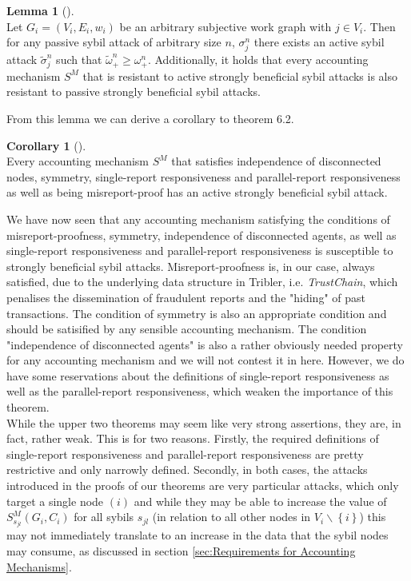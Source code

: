 \documentclass[11pt,a4paper]{report}
\theoremstyle{definition}
\theoremstyle{theorem}
\theoremstyle{proposition}
\theoremstyle{corollary}
\newtheorem{corollary}{Corollary}[section]
\theoremstyle{lemma}
\newtheorem{lemma}{Lemma}[section]
\theoremstyle{example}
\theoremstyle{remark}
\begin{document}
\begin{lemma}[]\ \\
Let $G_i=(V_i,E_i,w_i)$ be an arbitrary subjective work graph with $j\in{}V_i$. Then for any passive sybil attack of arbitrary size $n$, $\sigma_j^n$ there exists an active sybil attack $\tilde{\sigma}_j^n$ such that $\tilde{\omega}_{+}^n \geq \omega_{+}^n$. Additionally, it holds that every accounting mechanism $S^M$ that is resistant to active strongly beneficial sybil attacks is also resistant to passive strongly beneficial sybil attacks. 
\end{lemma}

\noindent{}From this lemma we can derive a corollary to theorem 6.2. \vspace{1em}\\

\begin{corollary}[]\ \\
Every accounting mechanism $S^M$ that satisfies independence of disconnected nodes, symmetry, single-report responsiveness and parallel-report responsiveness as well as being misreport-proof has an active strongly beneficial sybil attack. 
\end{corollary}

\noindent{}We have now seen that any accounting mechanism satisfying the conditions of misreport-proofness, symmetry, independence of disconnected agents, as well as single-report responsiveness and parallel-report responsiveness is susceptible to strongly beneficial sybil attacks. Misreport-proofness is, in our case, always satisfied, due to the underlying data structure in Tribler, i.e. {\it TrustChain}, which penalises the dissemination of fraudulent reports and the "hiding" of past transactions. The condition of symmetry is also an appropriate condition and should be satisified by any sensible accounting mechanism. The condition "independence of disconnected agents" is also a rather obviously needed property for any accounting mechanism and we will not contest it in here. However, we do have some reservations about the definitions of single-report responsiveness as well as the parallel-report responsiveness, which weaken the importance of this theorem. \vspace{1em}\\

\noindent{}While the upper two theorems may seem like very strong assertions, they are, in fact, rather weak. This is for two reasons. Firstly, the required definitions of single-report responsiveness and parallel-report responsiveness are pretty restrictive and only narrowly defined. Secondly, in both cases, the attacks introduced in the proofs of our theorems are very particular attacks, which only target a single node $(i)$ and while they may be able to increase the value of $S^M_{s_{jl}}(G_i,C_i)$ for all sybils $s_{jl}$ (in relation to all other nodes in $V_i\backslash{}\left\lbrace{}i\right\rbrace$) this may not immediately translate to an increase in the data that the sybil nodes may consume, as discussed in section \ref{sec:Requirements for Accounting Mechanisms}.\vspace{1em}\\
\end{document}
